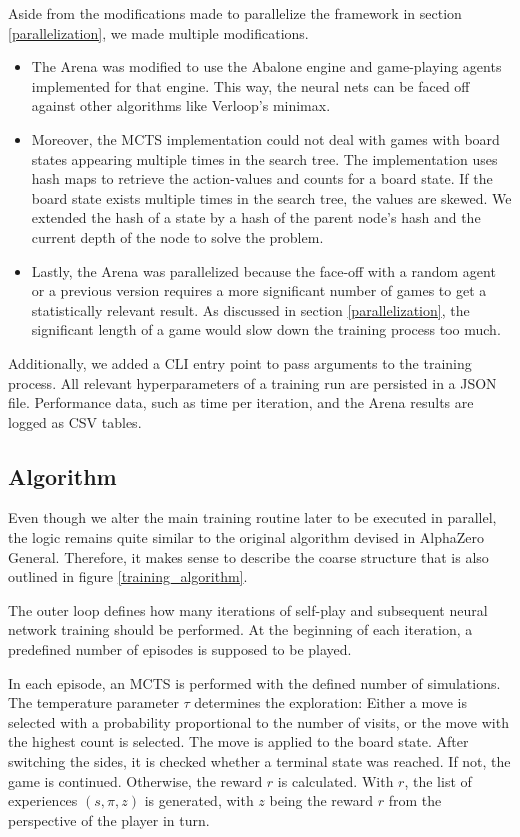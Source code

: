 Aside from the modifications made to parallelize the framework in section \ref{parallelization}, we made multiple modifications.
\begin{itemize}
    \item The Arena was modified to use the Abalone engine \cite{claussen_abalone_2021} and game-playing agents implemented for that engine. This way, the neural nets can be faced off against other algorithms like Verloop's minimax.
    \item Moreover, the MCTS implementation could not deal with games with board states appearing multiple times in the search tree. The implementation uses hash maps to retrieve the action-values and counts for a board state. If the board state exists multiple times in the search tree, the values are skewed. We extended the hash of a state by a hash of the parent node's hash and the current depth of the node to solve the problem.
    \item Lastly, the Arena was parallelized because the face-off with a random agent or a previous version requires a more significant number of games to get a statistically relevant result. As discussed in section \ref{parallelization}, the significant length of a game would slow down the training process too much.
\end{itemize}

Additionally, we added a CLI entry point to pass arguments to the training process. All relevant hyperparameters of a training run are persisted in a JSON file. Performance data, such as time per iteration, and the Arena results are logged as CSV tables.

\subsection{Algorithm}
Even though we alter the main training routine later to be executed in parallel, the logic remains quite similar to the original algorithm devised in AlphaZero General. Therefore, it makes sense to describe the coarse structure that is also outlined in figure \ref{training_algorithm}.

The outer loop defines how many iterations of self-play and subsequent neural network training should be performed. At the beginning of each iteration, a predefined number of episodes is supposed to be played.

In each episode, an MCTS is performed with the defined number of simulations. The temperature parameter $\tau$ determines the exploration: Either a move is selected with a probability proportional to the number of visits, or the move with the highest count is selected. The move is applied to the board state. After switching the sides, it is checked whether a terminal state was reached. If not, the game is continued. Otherwise, the reward $r$ is calculated. With $r$, the list of experiences $(s, \pi, z)$ is generated, with $z$ being the reward $r$ from the perspective of the player in turn.

